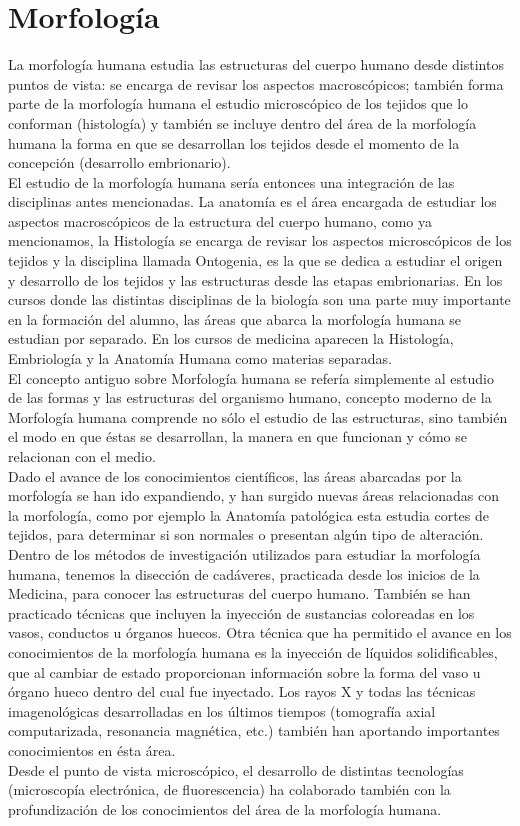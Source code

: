 \section{Morfología}
La morfología humana estudia las estructuras del cuerpo humano desde distintos 
puntos de vista: se encarga de revisar los aspectos macroscópicos; 
también forma parte de la morfología humana el estudio microscópico
de los tejidos que lo conforman (histología) y también se incluye dentro del 
área de la morfología humana la forma en que se 
desarrollan los tejidos desde el momento de la concepción (desarrollo embrionario).\\
El estudio de la morfología humana sería entonces una integración de 
las disciplinas antes mencionadas. La anatomía es el área encargada de estudiar los 
aspectos macroscópicos de la estructura del cuerpo humano, como ya mencionamos,
la Histología se encarga de revisar los aspectos microscópicos de los tejidos 
y la disciplina llamada Ontogenia, es la que se dedica a estudiar el origen 
y desarrollo de los tejidos y las estructuras desde las etapas embrionarias.
En los cursos donde las distintas disciplinas de la biología son una parte muy importante en la formación del alumno, las áreas que abarca la morfología 
humana se estudian por separado. En los cursos de medicina aparecen la Histología, Embriología y la Anatomía Humana como materias separadas.\\
El concepto antiguo sobre Morfología humana se refería simplemente al estudio de las formas y  las estructuras del organismo humano, 
concepto moderno de la Morfología humana comprende no sólo el estudio de las estructuras, sino también el modo en que éstas se desarrollan, 
la manera en que funcionan y cómo se relacionan con el medio.\\
Dado el avance de los conocimientos científicos, las áreas abarcadas por la morfología se han ido expandiendo, y han surgido nuevas áreas relacionadas con la morfología, 
como por ejemplo la Anatomía patológica esta estudia cortes de tejidos, para determinar  si son normales o presentan algún tipo de alteración.\\
Dentro de los métodos de investigación utilizados para estudiar la morfología humana, tenemos la disección de cadáveres, practicada desde los inicios de la Medicina, 
para conocer las estructuras del cuerpo humano. También se han practicado técnicas que incluyen la inyección de sustancias coloreadas en los vasos, conductos u órganos huecos. 
Otra técnica que ha permitido el avance en los conocimientos de la morfología humana es la inyección de líquidos solidificables, que al cambiar de estado proporcionan información 
sobre la forma del vaso u órgano hueco dentro del cual fue inyectado. Los rayos X y todas las técnicas imagenológicas desarrolladas en los últimos tiempos 
(tomografía axial computarizada, resonancia magnética, etc.) también han aportando importantes conocimientos en ésta área.\\
Desde el punto de vista microscópico, el desarrollo de distintas tecnologías (microscopía electrónica, de fluorescencia) ha colaborado también con la profundización de los 
conocimientos del área de la morfología humana.\\

